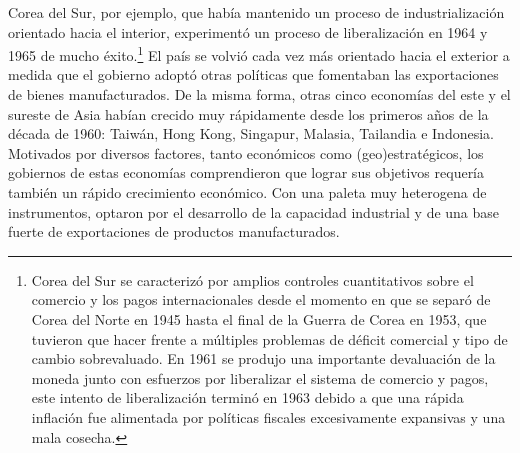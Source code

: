 \documentclass[10pt,a4paper]{article}
\begin{document}
Corea del Sur, por ejemplo, que había mantenido un proceso de industrialización orientado hacia el interior, experimentó un proceso de liberalización en 1964 y 1965 de mucho éxito.\footnote{%
    Corea del Sur se caracterizó por amplios controles cuantitativos sobre el comercio y los pagos internacionales desde el momento en que se separó de Corea del Norte en 1945 hasta el final de la Guerra de Corea en 1953, que tuvieron que hacer frente a múltiples problemas de déficit comercial y tipo de cambio sobrevaluado. En 1961 se produjo una importante devaluación de la moneda junto con esfuerzos por liberalizar el sistema de comercio y pagos, este intento de liberalización terminó en 1963 debido a que una rápida inflación fue alimentada por políticas fiscales excesivamente expansivas y una mala cosecha.
} El país se volvió cada vez más orientado hacia el exterior a medida que el gobierno adoptó otras políticas que fomentaban las exportaciones de bienes manufacturados. De la misma forma, otras cinco economías del este y el sureste de Asia habían crecido muy rápidamente desde los primeros años de la década de 1960: Taiwán, Hong Kong, Singapur, Malasia, Tailandia e Indonesia⁠. Motivados por diversos factores, tanto económicos como (geo)estratégicos, los gobiernos de estas economías comprendieron que lograr sus objetivos requería también un rápido crecimiento económico. Con una paleta muy heterogena de instrumentos, optaron por el desarrollo de la capacidad industrial y de una base fuerte de exportaciones de productos manufacturados.
\end{document}
